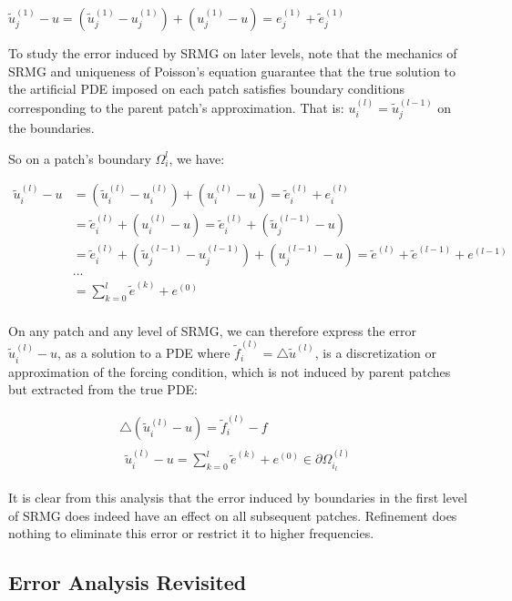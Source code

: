 \documentclass[final]{siamart1116}
\numberwithin{theorem}{section}
\begin{document}
$\tilde{u}^{(1)}_j - u = (\tilde{u}^{(1)}_j - u^{(1)}_j) + (u^{(1)}_j -  u) = e^{(1)}_j + \tilde{e}^{(1)}_j $


To study the error induced by SRMG on later levels, note that the mechanics of SRMG and uniqueness of Poisson's equation guarantee that the true solution to the artificial PDE imposed on each patch satisfies boundary conditions corresponding to the parent patch's approximation. That is: $u^{(l)}_i = \tilde{u}^{(l-1)}_j$ on the boundaries. 

So on a patch's boundary $\Omega^{l}_i$, we have:

\begin{align*}
\tilde{u}^{(l)}_i - u &=  (\tilde{u}^{(l)}_i - u^{(l)}_i) + (u^{(l)}_i - u) = \tilde{e}^{(l)}_i + e^{(l)}_i \\
&= \tilde{e}^{(l)}_i + (u^{(l)}_i - u) = \tilde{e}^{(l)}_i + (\tilde{u}^{(l-1)}_j - u) \\
& = \tilde{e}^{(l)}_i + (\tilde{u}^{(l-1)}_j - u^{(l-1)}_j) + (u^{(l-1)}_j - u) = \tilde{e}^{(l)} + \tilde{e}^{(l-1)} +  e^{(l-1)}\\
& ... \\
& = \sum_{k=0}^l \tilde{e}^{(k)} + e^{(0)} \\
\end{align*}

On any patch and any level of SRMG, we can therefore express the error $\tilde{u}^{(l)}_i - u$, as a solution to a PDE where $\tilde{f}^{(l)}_i = \bigtriangleup \tilde{u}^{(l)}$, is a discretization or approximation of the forcing condition, which is not induced by parent patches but extracted from the true PDE: 

\begin{gather*}
 \bigtriangleup (\tilde{u}^{(l)}_i - u) =  \tilde{f}^{(l)}_i - f  \\
  \begin{split}
    \tilde{u}^{(l)}_i - u = \sum_{k=0}^l \tilde{e}^{(k)} + e^{(0)}\in \partial \Omega^{(l)}_{i_l} \label{errorrevisited}
  \end{split}
\end{gather*}

It is clear from this analysis that the error induced by boundaries in the first level of SRMG does indeed have an effect on all subsequent patches. Refinement does nothing to eliminate this error or restrict it to higher frequencies. 	



\subsection{Error Analysis Revisited}
\end{document}
